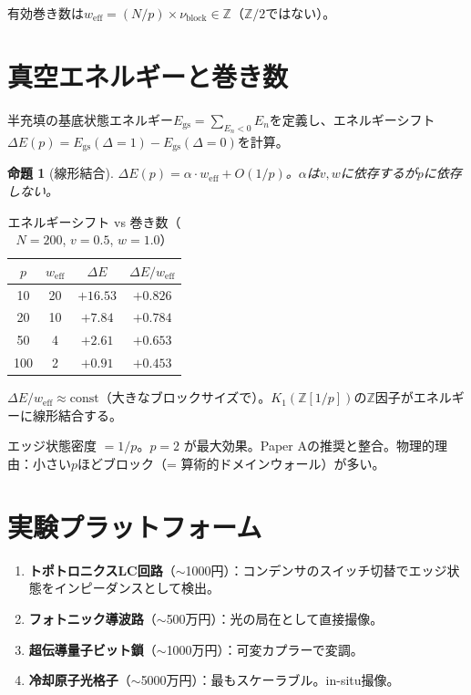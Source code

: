 \documentclass[11pt,a4paper]{article}
\newtheorem{proposition}[theorem]{命題}
\newcommand{\Zp}{\mathbb{Z}[1/p]}
\begin{document}
有効巻き数は$w_{\mathrm{eff}} = (N/p) \times \nu_{\mathrm{block}} \in \mathbb{Z}$（$\mathbb{Z}/2$ではない）。

\section{真空エネルギーと巻き数}

半充填の基底状態エネルギー$E_{\mathrm{gs}} = \sum_{E_n < 0} E_n$を定義し、エネルギーシフト$\Delta E(p) = E_{\mathrm{gs}}(\Delta=1) - E_{\mathrm{gs}}(\Delta=0)$を計算。

\begin{proposition}[線形結合]
$\Delta E(p) = \alpha \cdot w_{\mathrm{eff}} + O(1/p)$。$\alpha$は$v, w$に依存するが$p$に依存しない。
\end{proposition}

\begin{table}[h]
\centering
\caption{エネルギーシフト vs 巻き数（$N=200$, $v=0.5$, $w=1.0$）}
\begin{tabular}{@{}cccc@{}}
\toprule
$p$ & $w_{\mathrm{eff}}$ & $\Delta E$ & $\Delta E / w_{\mathrm{eff}}$ \\
\midrule
10 & 20 & $+16.53$ & $+0.826$ \\
20 & 10 & $+7.84$ & $+0.784$ \\
50 & 4 & $+2.61$ & $+0.653$ \\
100 & 2 & $+0.91$ & $+0.453$ \\
\bottomrule
\end{tabular}
\end{table}

$\Delta E / w_{\mathrm{eff}} \approx \mathrm{const}$（大きなブロックサイズで）。$K_1(\Zp)$の$\mathbb{Z}$因子がエネルギーに線形結合する。

エッジ状態密度 $= 1/p$。$p = 2$ が最大効果。Paper Aの推奨と整合。物理的理由：小さい$p$ほどブロック（= 算術的ドメインウォール）が多い。

\section{実験プラットフォーム}

\begin{enumerate}
\item \textbf{トポトロニクスLC回路}（$\sim$1000円）：コンデンサのスイッチ切替でエッジ状態をインピーダンスとして検出。
\item \textbf{フォトニック導波路}（$\sim$500万円）：光の局在として直接撮像。
\item \textbf{超伝導量子ビット鎖}（$\sim$1000万円）：可変カプラーで変調。
\item \textbf{冷却原子光格子}（$\sim$5000万円）：最もスケーラブル。in-situ撮像。
\end{enumerate}
\end{document}
